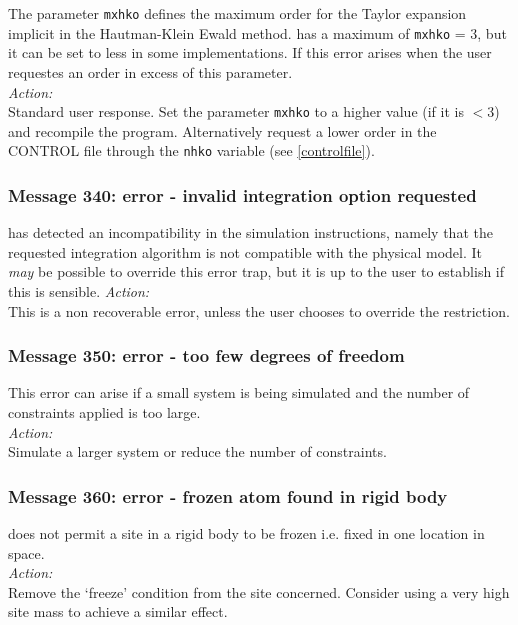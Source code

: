 The parameter {\tt mxhko} defines the maximum order for the Taylor
expansion implicit in the Hautman-Klein Ewald method. \D{} has a maximum
of {\tt mxhko} = 3, but it can be set to less in some
implementations. If this error arises when the user requestes an
order in excess of this parameter.\\

\noindent
{\em Action:} \\ Standard user response. Set the parameter {\tt mxhko}
to a higher value (if it is $<$3) and recompile the
program. Alternatively request a lower order in the CONTROL file
through the {\tt nhko} variable (see \ref{controlfile}).

\subsubsection*{Message 340: error - invalid integration option requested}

\D{} has detected an incompatibility in the simulation instructions,
namely that the requested integration algorithm is not compatible with
the physical model. It {\em may} be possible to override this error trap,
but it is up to the user to establish if this is sensible.
\noindent
{\em Action:} \\ 
This is a non recoverable error, unless the user chooses to override
the restriction.

\subsubsection*{Message 350: error - too few degrees of freedom}

This error can arise if a small system is being simulated and the
number of constraints applied is too large.\\

\noindent
{\em Action:} \\ 
Simulate a larger system or reduce the number of constraints.

\subsubsection*{Message 360: error - frozen atom found in rigid
body}

\D{} does not permit a site in a rigid body  to be frozen i.e.
fixed in one location in space. \\

\noindent
{\em Action:} \\
Remove the `freeze' condition from the site concerned. Consider using
a very high site mass to achieve a similar effect.

